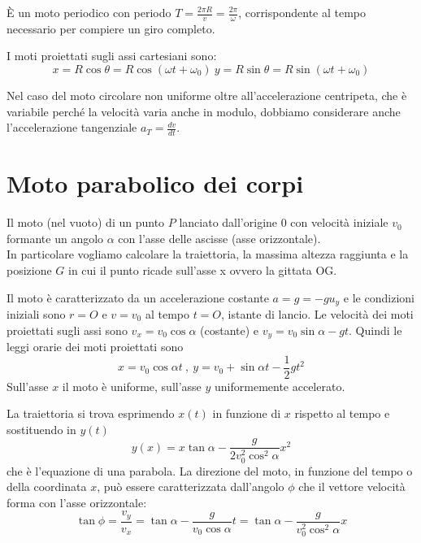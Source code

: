 \documentclass[class=book, crop=false, oneside, 12pt]{standalone}
\begin{document}
È un moto periodico con periodo \(T = \frac{2 \pi R}{v} = \frac{2 \pi}{\omega}\), corrispondente al tempo necessario per compiere un giro completo.

I moti proiettati sugli assi cartesiani sono:
\begin{equation}
  x = R \cos \theta = R \cos (\omega t + \omega_0) \
  y = R \sin \theta = R \sin (\omega t + \omega_0)
\end{equation}

Nel caso del moto circolare non uniforme oltre all'accelerazione centripeta, che è variabile perché la velocità varia anche in modulo, dobbiamo considerare anche l'accelerazione tangenziale \(a_T = \frac{dv}{dt} \).

\section{Moto parabolico dei corpi}

Il moto (nel vuoto) di un punto \(P\) lanciato dall'origine \(0\) con velocità iniziale \(v_0\) formante un angolo \(\alpha\) con l'asse delle ascisse (asse orizzontale).\\
In particolare vogliamo calcolare la traiettoria, la massima altezza raggiunta e la posizione \(G\) in cui il punto ricade sull'asse x ovvero la gittata OG.

Il moto è caratterizzato da un accelerazione costante \(a = g = -g u_y\) e le condizioni iniziali sono \(r = O\) e \(v = v_0\) al tempo \(t = O\), istante di lancio.
Le velocità dei moti proiettati sugli assi sono \(v_x = v_0 \cos \alpha\) (costante) e \(v_y = v_0 \sin \alpha - g t\).
Quindi le leggi orarie dei moti proiettati sono
\begin{equation}
  x = v_0 \cos \alpha t \ , \ y = v_0 + \sin \alpha t - \frac{1}{2} g t^2
\end{equation}
Sull'asse \(x\) il moto è uniforme, sull'asse \(y\) uniformemente accelerato.

La traiettoria si trova esprimendo \(x(t)\) in funzione di \(x\) rispetto al tempo e sostituendo in \(y(t)\)
\begin{equation}
  y(x) = x \tan \alpha - \frac{g}{2 v_0^2 \cos^2 \alpha} x^2
\end{equation}
che è l'equazione di una parabola.
La direzione del moto, in funzione del tempo o della coordinata \(x\), può essere caratterizzata dall'angolo \(\phi\) che il vettore velocità forma con l'asse orizzontale:
\begin{equation}
  \tan \phi = \frac{v_y}{v_x} = \tan \alpha - \frac{g}{v_0 \cos \alpha} t = \tan \alpha - \frac{g}{v_0^2 \cos^2 \alpha} x
\end{equation}
\end{document}
